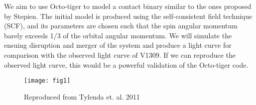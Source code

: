 \documentclass{article}
\begin{document}
We aim to use Octo-tiger to model a contact binary similar to the ones proposed by Stepien. The initial model is produced using the self-consistent field technique (SCF), and its parameters are chosen such that the spin angular momentum barely exceeds 1/3 of the orbital angular momentum. We will simulate the ensuing disruption and merger of the system and produce a light curve for comparison with the observed light curve of V1309. If we can reproduce the observed light curve, this would be a powerful validation of the Octo-tiger code.

\begin{figure}
\begin{center}
\texttt{[image: fig1]}
\end{center}
\caption{Reproduced from Tylenda et. al. 2011}
\end{figure}
\end{document}
